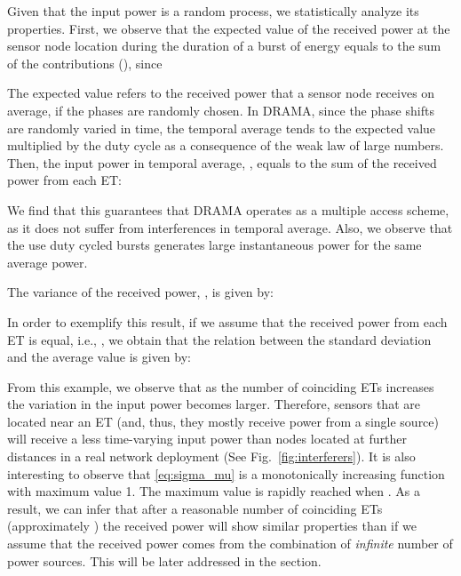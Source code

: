 \documentclass[conference]{IEEEtran}
\begin{document}
Given that the input power is a random process, we statistically analyze its properties.
First, we observe that the expected value of the received power at the sensor node location during the duration of a burst of energy equals to the sum of the contributions (), since

The expected value refers to the received power that a sensor node receives on average, if the phases are randomly chosen. In DRAMA, since the phase shifts are randomly varied in time, the temporal average tends to the expected value multiplied by the duty cycle as a consequence of the weak law of large numbers. Then, the input power in temporal average, , equals to the sum of the received power from each ET:

We find that 
this guarantees that DRAMA operates as a multiple access scheme, as it does not suffer from interferences in temporal average. Also, we observe that the use duty cycled bursts generates large instantaneous power for the same average power.

The variance of the received power, , is given by:

In order to exemplify this result, if we assume that the received power
from each ET is equal, i.e., , we obtain that the relation between the standard deviation and the average value is given by:

From this example, we observe that as the number of coinciding ETs increases the variation in the input power becomes larger. Therefore, sensors that are located near an ET (and, thus, they mostly receive power from a single source) will receive a less time-varying input power than nodes located at further distances in a real network deployment (See Fig.~\ref{fig:interferers}). It is also interesting to observe that \eqref{eq:sigma_mu} is a monotonically increasing function with maximum value 1. The maximum value is rapidly reached when . As a result, we can infer that after a reasonable number of coinciding ETs (approximately ) the received power will show similar properties than if we assume that the received power comes from the combination of \emph{infinite} number of power sources. This will be later addressed in the section.
\end{document}

